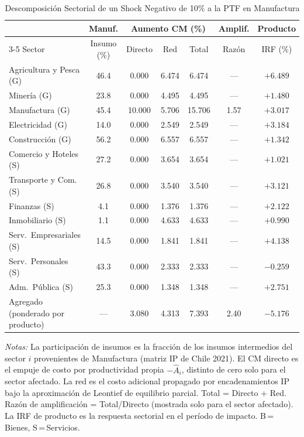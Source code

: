 \begin{table}[htbp]
\centering
\caption{Descomposición Sectorial de un Shock Negativo de 10\% a la PTF en Manufactura}
\label{tab:mfg_decomp}
\begin{threeparttable}
\small
\begin{tabular}{@{}l c c c c c c@{}}
\toprule
 & Manuf. & \multicolumn{3}{c}{Aumento CM (\%)} & Amplif. & Producto \\
\cmidrule(lr){3-5}
Sector & Insumo (\%) & Directo & Red & Total & Razón & IRF (\%) \\
\midrule
Agricultura y Pesca (G) & 46.4 & 0.000 & 6.474 & 6.474 & --- & $+6.489$ \\
Minería (G) & 23.8 & 0.000 & 4.495 & 4.495 & --- & $+1.480$ \\
Manufactura (G) & 45.4 & 10.000 & 5.706 & 15.706 &  1.57 & $+3.017$ \\
Electricidad (G) & 14.0 & 0.000 & 2.549 & 2.549 & --- & $+3.184$ \\
Construcción (G) & 56.2 & 0.000 & 6.557 & 6.557 & --- & $+1.342$ \\
Comercio y Hoteles (S) & 27.2 & 0.000 & 3.654 & 3.654 & --- & $+1.021$ \\
Transporte y Com. (S) & 26.8 & 0.000 & 3.540 & 3.540 & --- & $+3.121$ \\
Finanzas (S) &  4.1 & 0.000 & 1.376 & 1.376 & --- & $+2.122$ \\
Inmobiliario (S) &  1.1 & 0.000 & 4.633 & 4.633 & --- & $+0.990$ \\
Serv.\ Empresariales (S) & 14.5 & 0.000 & 1.841 & 1.841 & --- & $+4.138$ \\
Serv.\ Personales (S) & 43.3 & 0.000 & 2.333 & 2.333 & --- & $-0.259$ \\
Adm.\ Pública (S) & 25.3 & 0.000 & 1.348 & 1.348 & --- & $+2.751$ \\
\midrule
Agregado (ponderado por producto) & --- & 3.080 & 4.313 & 7.393 &  2.40 & $-5.176$ \\
\bottomrule
\end{tabular}
\begin{tablenotes}[flushleft]
\footnotesize
\item \textit{Notas:} La participación de insumos es la fracción de los insumos intermedios del sector $i$ provenientes de Manufactura (matriz IP de Chile 2021). El CM directo es el empuje de costo por productividad propia $-\hat A_i$, distinto de cero solo para el sector afectado. La red es el costo adicional propagado por encadenamientos IP bajo la aproximación de Leontief de equilibrio parcial. Total = Directo + Red. Razón de amplificación = Total/Directo (mostrada solo para el sector afectado). La IRF de producto es la respuesta sectorial en el período de impacto. B\,=\,Bienes, S\,=\,Servicios.
\end{tablenotes}
\end{threeparttable}
\end{table}
